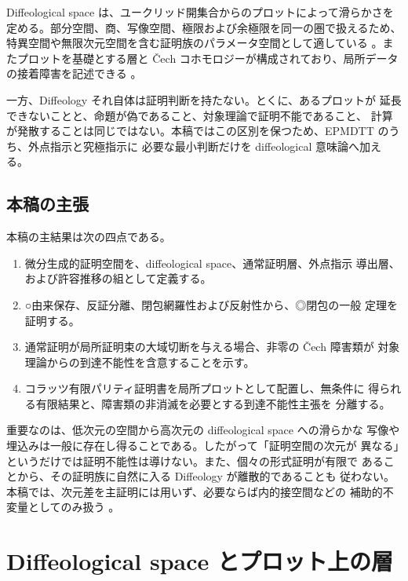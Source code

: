 \documentclass[a4paper,11pt]{ltjsarticle}
\theoremstyle{definition}
\theoremstyle{plain}
\newcommand{\1}{\mathbf{1}}
\begin{document}
Diffeological space は、ユークリッド開集合からのプロットによって滑らかさを
定める。部分空間、商、写像空間、極限および余極限を同一の圏で扱えるため、
特異空間や無限次元空間を含む証明族のパラメータ空間として適している
\cite{BaezHoffnung2011,IglesiasZemmour2013}。またプロットを基礎とする層と
Čech コホモロジーが構成されており、局所データの接着障害を記述できる
\cite{KrepskiWattsWolbert2022}。

一方、Diffeology それ自体は証明判断を持たない。とくに、あるプロットが
延長できないことと、命題が偽であること、対象理論で証明不能であること、
計算が発散することは同じではない。本稿ではこの区別を保つため、EPMDTT
\cite{ChibaExternal2026,ChibaEPMDTT2026} のうち、外点指示と究極指示に
必要な最小判断だけを diffeological 意味論へ加える。

\subsection{本稿の主張}

本稿の主結果は次の四点である。

\begin{enumerate}
 \item 微分生成的証明空間を、diffeological space、通常証明層、外点指示
       導出層、および許容推移の組として定義する。
 \item ○由来保存、反証分離、閉包網羅性および反射性から、◎閉包の一般
       定理を証明する。
 \item 通常証明が局所証明束の大域切断を与える場合、非零の Čech 障害類が
       対象理論からの到達不能性を含意することを示す。
 \item コラッツ有限パリティ証明書を局所プロットとして配置し、無条件に
       得られる有限結果と、障害類の非消滅を必要とする到達不能性主張を
       分離する。
\end{enumerate}

重要なのは、低次元の空間から高次元の diffeological space への滑らかな
写像や埋込みは一般に存在し得ることである。したがって「証明空間の次元が
異なる」というだけでは証明不能性は導けない。また、個々の形式証明が有限で
あることから、その証明族に自然に入る Diffeology が離散的であることも
従わない。本稿では、次元差を主証明には用いず、必要ならば内的接空間などの
補助的不変量としてのみ扱う \cite{ChristensenWu2016}。

\section{Diffeological space とプロット上の層}
\end{document}
